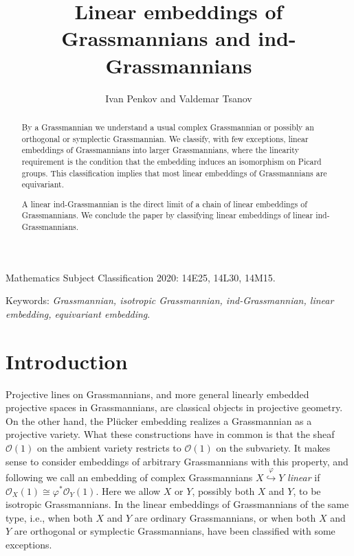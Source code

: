\documentclass[12pt]{amsart}
\def\mc {\mathcal}
\begin{document}
\pagestyle{plain}

\title{Linear embeddings of Grassmannians and ind-Grassmannians}
\author{Ivan Penkov and Valdemar Tsanov}

\maketitle



\begin{abstract}
By a Grassmannian we understand a usual complex Grassmannian or possibly an orthogonal or symplectic Grassmannian. We classify, with few exceptions, linear embeddings of Grassmannians into larger Grassmannians, where the linearity requirement is the condition that the embedding induces an isomorphism on Picard groups. This classification implies that most linear embeddings of Grassmannians are equivariant.

A linear ind-Grassmannian is the direct limit of a chain of linear embeddings of Grassmannians. We conclude the paper by classifying linear embeddings of linear ind-Grassmannians.
\end{abstract}

{\small
\noindent Mathematics Subject Classification 2020: 14E25, 14L30, 14M15.

\noindent Keywords: {\it Grassmannian, isotropic Grassmannian, ind-Grassmannian, linear embedding, equivariant embedding}. 
}

\section*{Introduction}

Projective lines on Grassmannians, and more general linearly embedded projective spaces in Grassmannians, are classical objects in projective geometry. On the other hand, the Pl\"ucker embedding realizes a Grassmannian as a projective variety. What these constructions have in common is that the sheaf $\mc O(1)$ on the ambient variety restricts to $\mc O(1)$ on the subvariety. It makes sense to consider embeddings of arbitrary Grassmannians with this property, and following \cite{Penkov-Tikhomirov-Lin-ind-Grass} we call an embedding of complex Grassmannians $X\stackrel{\varphi}{\hookrightarrow} Y$ {\it linear} if $\mc O_X(1) \cong \varphi^*\mc O_Y(1)$. Here we allow $X$ or $Y$, possibly both $X$ and $Y$, to be isotropic Grassmannians. In \cite{Penkov-Tikhomirov-Lin-ind-Grass} the linear embeddings of Grassmannians of the same type, i.e., when both $X$ and $Y$ are ordinary Grassmannians, or when both $X$ and $Y$ are orthogonal or symplectic Grassmannians, have been classified with some exceptions. 
\end{document}
